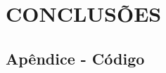 
\chapter{CONCLUSÕES}
\label{chap:conclusoes}

\section{Apêndice - Código}
\label{sec:ApenCodigo}




